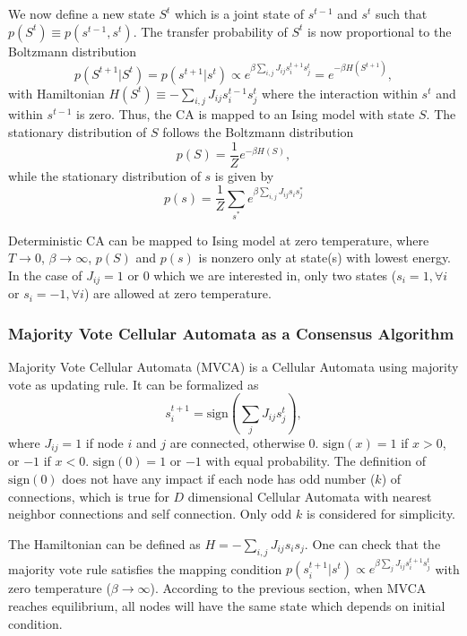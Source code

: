 \documentclass[reprint,pre,aps]{revtex4-1}
\begin{document}
We now define a new state $S^t$ which is a joint state of $s^{t-1}$ and $s^t$ such that $p(S^t) \equiv p(s^{t-1}, s^t)$. The transfer probability of $S^t$ is now proportional to the Boltzmann distribution
\begin{equation}
p(S^{t+1} | S^{t}) = p(s^{t+1} | s^t) \propto e^{\beta \sum_{i,j} J_{ij} s^{t+1}_i s^t_j} = e^{-\beta H(S^{t+1})},
\end{equation}
with Hamiltonian $H(S^t) \equiv -\sum_{i,j} J_{ij} s^{t-1}_i s^t_j$ where the interaction within $s^t$ and within $s^{t-1}$ is zero. Thus, the CA is mapped to an Ising model with state $S$. The stationary distribution of $S$ follows the Boltzmann distribution
\begin{equation}
p(S) = \frac{1}{Z} e^{-\beta H(S)},
\end{equation}
while the stationary distribution of $s$ is given by
\begin{equation}
p(s) = \frac{1}{Z} \sum_{s^*} e^{\beta \sum_{i,j} J_{ij} s_i s^*_j}
\end{equation}

Deterministic CA can be mapped to Ising model at zero temperature, where $T \to 0$, $\beta \to \infty$, $p(S)$ and $p(s)$ is nonzero only at state(s) with lowest energy. In the case of $J_{ij} = 1$ or $0$ which we are interested in, only two states ($s_i = 1, \forall i$ or $s_i = -1, \forall i$) are allowed at zero temperature.

\subsubsection{Majority Vote Cellular Automata as a Consensus Algorithm}

Majority Vote Cellular Automata (MVCA) is a Cellular Automata using majority vote as updating rule. It can be formalized as
\begin{equation}
s^{t+1}_i = \text{sign} \left( \sum_j J_{ij} s^t_j \right),
\end{equation}
where $J_{ij} = 1$ if node $i$ and $j$ are connected, otherwise $0$. $\text{sign}(x) = 1$ if $x > 0$, or $-1$ if $x < 0$. $\text{sign}(0) = 1$ or $-1$ with equal probability. The definition of $\text{sign}(0)$ does not have any impact if each node has odd number ($k$) of connections, which is true for $D$ dimensional Cellular Automata with nearest neighbor connections and self connection. Only odd $k$ is considered for simplicity.

The Hamiltonian can be defined as $H = -\sum_{i,j} J_{ij} s_i s_j$. One can check that the majority vote rule satisfies the mapping condition $p(s^{t+1}_i | s^t) \propto e^{\beta \sum_j J_{ij} s^{t+1}_i s^t_j}$ with zero temperature ($\beta \to \infty$). According to the previous section, when MVCA reaches equilibrium, all nodes will have the same state which depends on initial condition.
\end{document}
